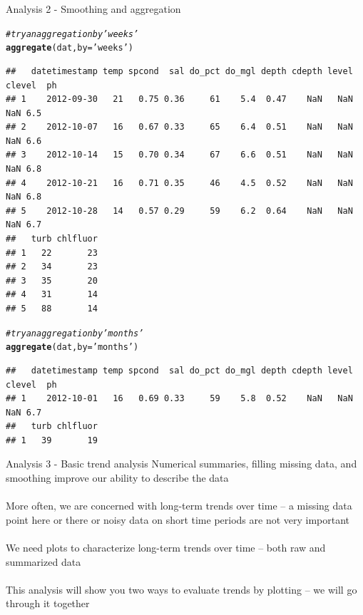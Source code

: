 \documentclass[xcolor=svgnames]{beamer}\usepackage[]{graphicx}\usepackage[]{color}
\makeatletter
\newcommand{\hlstr}[1]{\textcolor[rgb]{0.192,0.494,0.8}{#1}}%
\newcommand{\hlcom}[1]{\textcolor[rgb]{0.678,0.584,0.686}{\textit{#1}}}%
\newcommand{\hlstd}[1]{\textcolor[rgb]{0.345,0.345,0.345}{#1}}%
\newcommand{\hlkwc}[1]{\textcolor[rgb]{0.333,0.667,0.333}{#1}}%
\newcommand{\hlkwd}[1]{\textcolor[rgb]{0.737,0.353,0.396}{\textbf{#1}}}%
\newenvironment{kframe}{%
 \def\at@end@of@kframe{}%
 \ifinner\ifhmode%
  \def\at@end@of@kframe{\end{minipage}}%
  \begin{minipage}{\columnwidth}%
 \fi\fi%
 \def\FrameCommand##1{\hskip\@totalleftmargin \hskip-\fboxsep
 \colorbox{shadecolor}{##1}\hskip-\fboxsep
     \hskip-\linewidth \hskip-\@totalleftmargin \hskip\columnwidth}%
 \MakeFramed {\advance\hsize-\width
   \@totalleftmargin\z@ \linewidth\hsize
   \@setminipage}}%
 {\par\unskip\endMakeFramed%
 \at@end@of@kframe}
\newenvironment{knitrout}{}{} %
\makeatother
\begin{document}
\begin{frame}[containsverbatim]{Analysis 2 - Smoothing and aggregation}
\begin{knitrout}\scriptsize
{}\color{fgcolor}\begin{kframe}
\begin{alltt}
\hlcom{# try an aggregation by 'weeks'}
\hlkwd{aggregate}\hlstd{(dat,} \hlkwc{by} \hlstd{=} \hlstr{'weeks'}\hlstd{)}
\end{alltt}
\begin{verbatim}
##   datetimestamp temp spcond  sal do_pct do_mgl depth cdepth level clevel  ph
## 1    2012-09-30   21   0.75 0.36     61    5.4  0.47    NaN   NaN    NaN 6.5
## 2    2012-10-07   16   0.67 0.33     65    6.4  0.51    NaN   NaN    NaN 6.6
## 3    2012-10-14   15   0.70 0.34     67    6.6  0.51    NaN   NaN    NaN 6.8
## 4    2012-10-21   16   0.71 0.35     46    4.5  0.52    NaN   NaN    NaN 6.8
## 5    2012-10-28   14   0.57 0.29     59    6.2  0.64    NaN   NaN    NaN 6.7
##   turb chlfluor
## 1   22       23
## 2   34       23
## 3   35       20
## 4   31       14
## 5   88       14
\end{verbatim}
\begin{alltt}
\hlcom{# try an aggregation by 'months'}
\hlkwd{aggregate}\hlstd{(dat,} \hlkwc{by} \hlstd{=} \hlstr{'months'}\hlstd{)}
\end{alltt}
\begin{verbatim}
##   datetimestamp temp spcond  sal do_pct do_mgl depth cdepth level clevel  ph
## 1    2012-10-01   16   0.69 0.33     59    5.8  0.52    NaN   NaN    NaN 6.7
##   turb chlfluor
## 1   39       19
\end{verbatim}
\end{kframe}
\end{knitrout}
\end{frame}

\begin{frame}[containsverbatim]{Analysis 3 - Basic trend analysis}
Numerical summaries, filling missing data, and smoothing improve our ability to describe the data \\~\\
More often, we are concerned with \alert{long-term trends} over time -- a missing data point here or there or noisy data on short time periods are not very important \\~\\
We need \alert{plots} to characterize long-term trends over time -- both \alert{raw} and \alert{summarized} data \\~\\
This analysis will show you two ways to evaluate trends by plotting -- we will go through it together
\end{frame}
\end{document}
